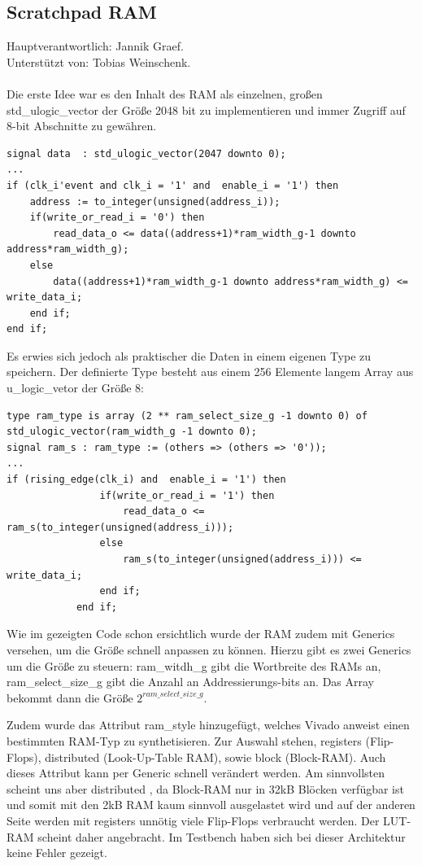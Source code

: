 \documentclass[bibliography=totoc,listof=totoc,index=totoc]{scrartcl}
\begin{document}
\subsection{Scratchpad RAM}
Hauptverantwortlich: Jannik Graef.\\  Unterstützt von: Tobias Weinschenk.\\\\
Die erste Idee war es den Inhalt des RAM als einzelnen, großen  std\_ulogic\_vector der Größe 2048 bit zu implementieren und immer Zugriff auf 8-bit Abschnitte zu gewähren.\\
\begin{small}
\begin{verbatim}
signal data  : std_ulogic_vector(2047 downto 0);
...
if (clk_i'event and clk_i = '1' and  enable_i = '1') then
	address := to_integer(unsigned(address_i));
	if(write_or_read_i = '0') then
		read_data_o <= data((address+1)*ram_width_g-1 downto address*ram_width_g);
	else
		data((address+1)*ram_width_g-1 downto address*ram_width_g) <= write_data_i;
	end if;
end if;
\end{verbatim}
\end{small}
Es erwies sich jedoch als praktischer die Daten in einem eigenen Type zu speichern. Der definierte Type besteht aus einem 256 Elemente langem Array aus u\_logic\_vetor der Größe 8:\\
\begin{small}
\begin{verbatim}
type ram_type is array (2 ** ram_select_size_g -1 downto 0) of std_ulogic_vector(ram_width_g -1 downto 0);
signal ram_s : ram_type := (others => (others => '0'));
...
if (rising_edge(clk_i) and  enable_i = '1') then
                if(write_or_read_i = '1') then
                    read_data_o <= ram_s(to_integer(unsigned(address_i)));
                else
                    ram_s(to_integer(unsigned(address_i))) <= write_data_i;
                end if;
            end if;
\end{verbatim}
\end{small}
Wie im gezeigten Code schon ersichtlich wurde der RAM zudem mit Generics versehen, um die Größe schnell anpassen zu können. Hierzu gibt es zwei Generics um die Größe zu steuern: \glqq ram\_witdh\_g \grqq \space gibt die Wortbreite des RAMs an, \glqq ram\_select\_size\_g \grqq \space gibt die Anzahl an Addressierungs-bits an. Das Array bekommt dann die Größe $2^{ram\_select\_size\_g}$.

Zudem wurde das Attribut \glqq ram\_style \grqq \space hinzugefügt, welches Vivado anweist einen bestimmten RAM-Typ zu synthetisieren. Zur Auswahl stehen, \glqq registers \grqq (Flip-Flops), \glqq distributed \grqq(Look-Up-Table RAM), sowie \glqq block \grqq (Block-RAM). Auch dieses Attribut kann per Generic schnell verändert werden. Am sinnvollsten scheint uns aber \glqq distributed \grqq, da Block-RAM nur in 32kB Blöcken verfügbar ist und somit mit den 2kB RAM kaum sinnvoll ausgelastet wird und auf der anderen Seite werden mit \glqq registers \grqq \space unnötig viele Flip-Flops verbraucht werden. Der LUT-RAM scheint daher angebracht. Im Testbench haben sich bei dieser Architektur keine Fehler gezeigt.
\end{document}
